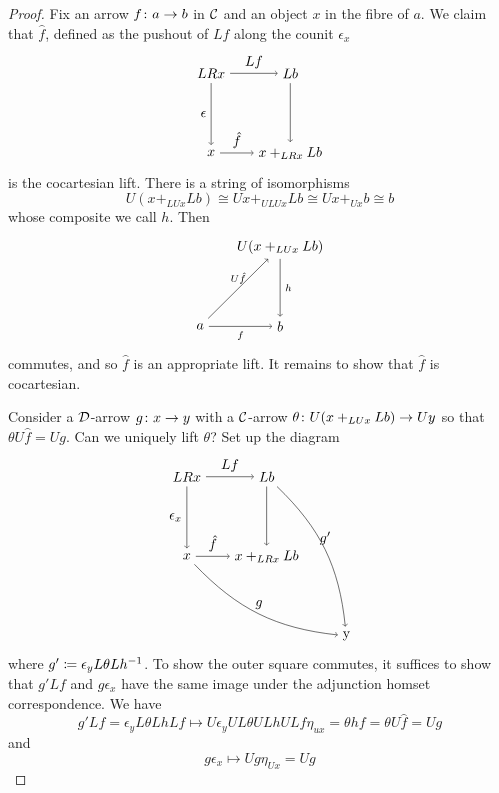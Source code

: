 \documentclass{amsart}
\begin{document}
\begin{proof}
  Fix an arrow $ f \colon a \to b $ in $ \mathcal{C} $
  and an object $ x $ in the fibre of $ a $. We
  claim that $ \hat{f} $, defined as the pushout of $ Lf $
  along the counit $ \epsilon_x $
  \[
    \begin{tikzpicture}
      \node (ul) at (0,2) {$ LRx $};
      \node (ll) at (0,0) {$ x $};
      \node (ur) at (2,2) {$ Lb $};
      \node (lr) at (2,0) {$ x +_{LRx} Lb$};
      \draw [->] (ul) to node [left] {$ \epsilon $} (ll);
      \draw [->] (ul) to node [above] {$ Lf $} (ur);
      \draw [->] (ll) to node [above] {$ \hat{f} $} (lr);
      \draw [->] (ur) to (lr);
    \end{tikzpicture}
  \]
  is the cocartesian lift. There is a string of
  isomorphisms
  \[
    U ( x +_{LUx} Lb ) \cong
    Ux +_{ULUx} Lb \cong
    Ux +_{Ux} b \cong
    b
  \]
  whose composite we call $ h $.  Then
  \[
    \begin{tikzpicture}
      \node (a) at (0,0) {$ a $};
      \node (b) at (2,0) {$ b $};
      \node (c) at (2,2) {$ U ( x+_{LUx} Lb ) $};
      \path[->,font=\scriptsize]
      (a) edge node[below]{$ f $} (b)
      (a) edge node[above]{$ U\hat{f} $} (c)
      (c) edge node[right]{$ h $} (b);
    \end{tikzpicture}
  \]
  commutes, and so $ \hat{f} $ is an appropriate
  lift. It remains to show that $ \hat{f} $ is
  cocartesian.

  Consider a $ \mathcal{D} $-arrow $ g \colon x \to y $
  with a $ \mathcal{C} $-arrow
  $ \theta \colon U( x +_{LUx} Lb ) \to Uy $ so
  that $ \theta U \hat{f} = Ug $.  Can we
  uniquely lift $ \theta $? Set up the diagram
  \[
    \begin{tikzpicture}
      \node (ul) at (0,2) {$ LRx $};
      \node (ll) at (0,0) {$ x $};
      \node (ur) at (2,2) {$ Lb $};
      \node (lr) at (2,0) {$ x +_{LRx} Lb$};
      \node (comp) at (4,-2) {y};
      \draw [->] (ul) to node [left] {$ \epsilon_x $} (ll);
      \draw [->] (ul) to node [above] {$ Lf $} (ur);
      \draw [->] (ll) to node [above] {$ \hat{f} $} (lr);
      \draw [->] (ur) to (lr);
      \draw [->] (ll) to [bend right=20] node [above] {$ g $} (comp);
      \draw [->] (ur) to [bend left=20] node [above] {$ g' $} (comp);
    \end{tikzpicture}
  \] 
  where $ g' \coloneqq \epsilon_y L\theta Lh^{-1} $.
  To show the outer square commutes, it suffices
  to show that $ g' Lf $ and $ g \epsilon_x $
  have the same image under the adjunction homset
  correspondence.  We have
  \[
    g' Lf = \epsilon_y L\theta Lh Lf
    \mapsto
    U\epsilon_y UL\theta ULh ULf \eta_{ux}
    = \theta h f   
    = \theta U \hat{f} 
    = Ug
  \]
  and 
  \[
    g \epsilon_x
    \mapsto
    Ug \eta_{Ux}
    = Ug
  \]
\end{proof}
\end{document}
